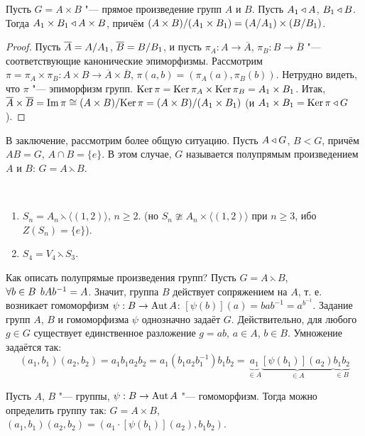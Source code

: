 \documentclass[main]{subfiles}
\begin{document}
\begin{proposition}
  Пусть \( G = A \times B \) "--- прямое произведение
  групп \( A \) и \( B \).
  Пусть \( A_1 \triangleleft A \), \( B_1 \triangleleft B \).
  Тогда \( A_1 \times B_1 \triangleleft A \times B \),
  причём \( \Factor{(A \times B)}[(A_1 \times B_1)] =
  (\Factor{A}[A_1]) \times (\Factor{B}[B_1]) \).
\end{proposition}
\begin{proof}
  Пусть \( \overline{A} = \Factor{A}[A_1] \),
  \( \overline{B} = \Factor{B}[B_1] \), и
  пусть \( \pi_A : A \to \overline{A} \),
  \( \pi_B : B \to \overline{B} \) "---
  соответствующие канонические эпиморфизмы.
  Рассмотрим \( \pi = \pi_A \times \pi_B :
  A \times B \to \overline{A} \times \overline{B} \),
  \( \pi(a, b) = (\pi_A(a), \pi_B(b)) \).
  Нетрудно видеть, что \( \pi \) "---
  эпиморфизм групп.
  \( \operatorname{Ker} \pi = \operatorname{Ker} \pi_A \times \operatorname{Ker} \pi_B =
  A_1 \times B_1 \).
  Итак, \( \overline{A} \times \overline{B} =
  \Img \pi \cong \Factor{(A \times B)}[\Ker \pi] =
  \Factor{(A \times B)}[(A_1 \times B_1)] \)
  (и \( A_1 \times B_1 = \operatorname{Ker} \pi \triangleleft G \)).
\end{proof}

В заключение, рассмотрим более общую ситуацию.
Пусть \( A \triangleleft G \), \( B < G \),
причём \( AB = G \), \( A \cap B = \{ e \} \).
В этом случае, \( G \) называется
полупрямым произведением \( A \) и \( B \):
\( G = A \leftthreetimes B \).

\begin{examples}~
  \begin{enumerate}
    \item \( S_n = A_n \leftthreetimes
      \langle (1, 2) \rangle \), \( n \ge 2 \).
      (но \( S_n \ncong A_n \times \langle (1, 2) \rangle \)
      при \( n \ge 3 \), ибо \(
      Z(S_n) = \{ e \} \)).
    \item \( S_4 = V_4 \leftthreetimes S_3 \).
  \end{enumerate}
\end{examples}

Как описать полупрямые произведения групп?
Пусть \( G = A \leftthreetimes B \),
\( \forall {b \in B} \; \, b A b^{-1} = A \).
Значит, группа \( B \) действует сопряжением
на \( A \), т. е. возникает гомоморфизм
\( \psi : B \to \operatorname{Aut} A \):
\( [\psi(b)](a) = b a b^{-1} = a^{b^{-1}} \).
Задание групп \( A \), \( B \) и гомоморфизма
\( \psi \) однозначно задаёт \( G \).
Действительно, для любого \( g \in G \)
существует единственное разложение
\( g = ab \), \( a \in A \), \( b \in B \).
Умножение задаётся так:
\[
  (a_1, b_1)(a_2, b_2) =
  a_1 b_1 a_2 b_2 = a_1 (b_1 a_2 b_1^{-1}) b_1 b_2 =
  \underbrace{a_1}_{\in A} \underbrace{[\psi(b_1)](a_2)}_{\in A}
  \underbrace{b_1 b_2}_{\in B}
\]

\begin{exercise}
  Пусть \( A \), \( B \) "--- группы,
  \( \psi : B \to \operatorname{Aut} A \) "--- гомоморфизм.
  Тогда можно определить группу так: \( G = A \times B \),
  \( (a_1, b_1)(a_2, b_2) = (a_1 \cdot [\psi(b_1)](a_2), b_1 b_2) \).
\end{exercise}
\end{document}
